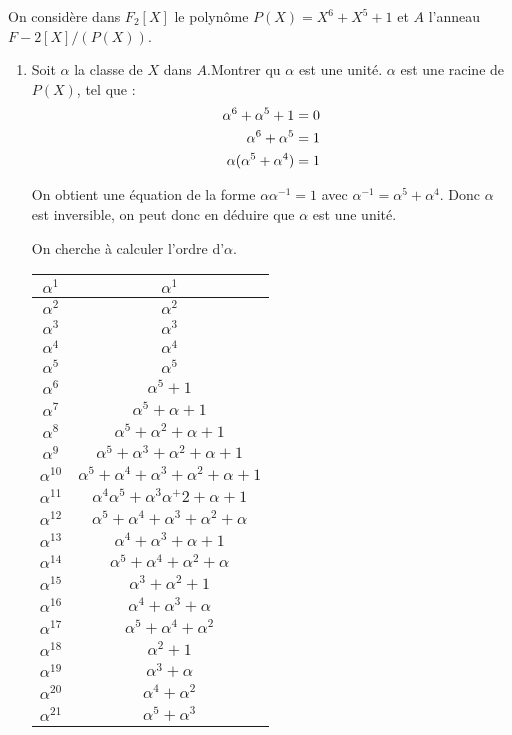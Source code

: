 \documentclass[a4paper,10pt]{article}
\begin{document}
	On considère dans $F_2[X]$ le polynôme $P(X)=X^6+X^5+1$ et $A$ l'anneau $F-2[X]/(P(X))$.
	\begin{enumerate}
	\item
	Soit $\alpha$ la classe de $X$ dans $A$.Montrer qu $\alpha$ est une unité.
	$\alpha$ est une racine de $P(X)$, tel que :
	\begin{align}
		\alpha^6+\alpha^5+1=0 \notag \\
		\alpha^6+\alpha^5=1 \notag \\
		\alpha(\alpha^5+\alpha^4)=1 \notag 
	\end{align}
	
	On obtient une équation de la forme $\alpha\alpha^{-1}=1$ avec $\alpha^{-1}=\alpha^5+\alpha^4$. Donc $\alpha$ est inversible, on peut donc en déduire que $\alpha$ est une unité.
	
On cherche à calculer l'ordre d'$\alpha$.

\begin{tabular}{|c|c|}
	\hline 	
	$\alpha^1$ & $\alpha^1$\\
	\hline 	
	$\alpha^2$ & $\alpha^2$\\
	\hline 	
	$\alpha^3$ & $\alpha^3$\\
	\hline 	
	$\alpha^4$ & $\alpha^4$\\
	\hline 	
	$\alpha^5$ & $\alpha^5$\\
	\hline 	
	$\alpha^6$ & $\alpha^5+1 $\\
	\hline 	
	$\alpha^7$ & $ \alpha^5+\alpha+1$\\
	\hline 	
	$\alpha^8$ &$\alpha^5+\alpha^2+\alpha+1 $ \\
	\hline 	
	$\alpha^9$ & $ \alpha^5+\alpha^3+\alpha^2+\alpha+1$\\
	\hline 	
	$\alpha^{10}$ & $ \alpha^5+\alpha^4+\alpha^3+\alpha^2+\alpha+1$\\
	\hline 	
	$\alpha^{11}$ & $\alpha^4\alpha^5+\alpha^3\alpha^+2+\alpha+1 $\\
	\hline 	
	$\alpha^{12}$ & $ \alpha^5+\alpha^4+\alpha^3+\alpha^2+\alpha$\\
	\hline 	
	$\alpha^{13}$ & $ \alpha^4+\alpha^3+\alpha+1$\\
	\hline 	
	$\alpha^{14}$ & $ \alpha^5+\alpha^4+\alpha^2+\alpha$\\
	\hline 	
	$\alpha^{15}$ & $\alpha^3+\alpha^2+1 $\\
	\hline 	
	$\alpha^{16}$ & $ \alpha^4+\alpha^3+\alpha$\\
	\hline 	
	$\alpha^{17}$ & $ \alpha^5+\alpha^4+\alpha^2$\\
	\hline 	
	$\alpha^{18}$ & $\alpha^2+1 $\\
	\hline 	
	$\alpha^{19}$ & $ \alpha^3+\alpha$\\
	\hline 	
	$\alpha^{20}$ & $ \alpha^4+\alpha^2$\\
	\hline 	
	$\alpha^{21}$ & $\alpha^5+\alpha^3 $\\
	\hline
\end{tabular}


\end{enumerate}
\end{document}
